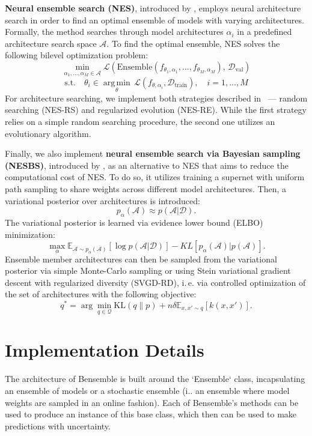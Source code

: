 \documentclass[a4paper,fleqn]{cas-dc}
\begin{document}
\textbf{Neural ensemble search (NES)}, introduced by \cite{zaidi2021neural}, employs neural architecture search in order to find an optimal ensemble of models with varying architectures. Formally, the method searches through model architectures $\alpha_i$ in a predefined architecture search space $\mathcal{A}$. To find the optimal ensemble, NES solves the following bilevel optimization problem:
$$
\min_{\alpha_1, \dots, \alpha_M \in \mathcal{A}} \mathcal{L}\!\left(\mathrm{Ensemble}(f_{\theta_1,\alpha_1}, \dots, f_{\theta_M,\alpha_M}),\, \mathcal{D}_{\mathrm{val}}\right)
$$$$
\text{s.t.} \quad \theta_i \in \operatorname*{arg\,min}_{\theta}\, \mathcal{L}(f_{\theta,\alpha_i}, \mathcal{D}_{\mathrm{train}}), \quad i = 1, \dots, M
$$
For architecture searching, we implement both strategies described in \cite{zaidi2021neural}~--- random searching (NES-RS) and regularized evolution (NES-RE). While the first strategy relies on a simple random searching procedure, the second one utilizes an evolutionary algorithm.

Finally, we also implement \textbf{neural ensemble search via Bayesian sampling (NESBS)}, introduced by \cite{shu2022neural}, as an alternative to NES that aims to reduce the computational cost of NES. To do so, it utilizes training a supernet with uniform path sampling to share weights across different model architectures. Then, a variational posterior over architectures is introduced:
$$
p_{\alpha}(\mathcal{A})\approx p(\mathcal{A} | \mathcal{D}).
$$
The variational posterior is learned via evidence lower bound (ELBO) minimization: 
$$
\max_\alpha \mathbb{E}_{\mathcal{A}\sim p_{\alpha}(\mathcal{A})} [\log p(\mathcal{A}|\mathcal{D})] - KL[p_{\alpha}(\mathcal{A})|p(\mathcal{A})].
$$
Ensemble member architectures can then be sampled from the variational posterior via simple Monte-Carlo sampling or using Stein variational gradient descent with regularized diversity (SVGD-RD), i.\,e. via controlled optimization of the set of architectures with the following objective:
$$
q^* = \arg\min_{q\in\mathcal{Q}} \text{KL}(q\|p) + n\delta\mathbb{E}_{x, x' \sim q}[k(x, x')].
$$

\section{Implementation Details}
The architecture of Bensemble is built around the `Ensemble` class, incapsulating an ensemble of models or a stochastic ensemble (i.\e. an ensemble where model weights are sampled in an online fashion). Each of Bensemble's methods can be used to produce an instance of this base class, which then can be used to make predictions with uncertainty.
\end{document}
